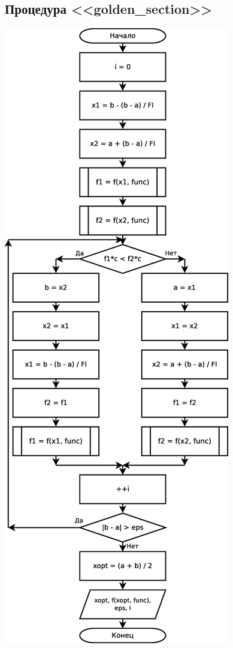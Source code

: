 \documentclass[a4paper]{article}
\begin{document}
\subsection{Процедура <<golden\_section>>}
\includegraphics[scale=0.35]{schemes/golden_section}
\end{document}
